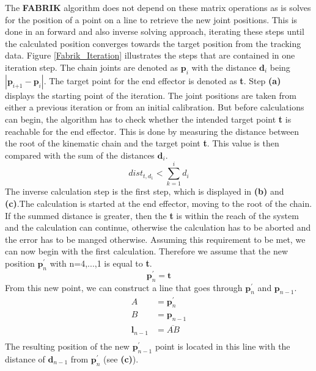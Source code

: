 The \textbf{FABRIK} algorithm does not depend on these matrix operations as is solves for the position of a point on a line to retrieve the new joint positions. This is done in an forward and also inverse solving approach, iterating these steps until the calculated position converges towards the target position from the tracking data.
Figure \ref{Fabrik_Iteration} illustrates the steps that are contained in one iteration step.
The chain joints are denoted as $\textbf{p}_{\textit{i}}$ with the distance $\textbf{d}_{i}$ being $|\textbf{p}_{\textit{i+1}}-\textbf{p}_{\textit{i}}|$. The target point for the end effector is denoted as \textbf{t}. Step \textbf{(a)} displays the starting point of the iteration. The joint positions are taken from either a previous iteration or from an initial calibration. 
But before calculations can begin, the algorithm has to check whether the intended target point \textbf{t} is reachable for the end effector. This is done by measuring the distance between the root of the kinematic chain and the target point \textbf{t}. This value is then compared with the sum of the distances $\textbf{d}_{i}$.
\begin{equation}
 dist_{t,d_{1}}< \sum_{k=1}^{i}{d_{i}}
\end{equation}The inverse calculation step is the first step, which is displayed in \textbf{(b)} and \textbf{(c)}.The calculation is started at the end effector, moving to the root of the chain. 
If the summed distance is greater, then the \textbf{t} is within the reach of the system and the calculation can continue, otherwise the calculation has to be aborted and the error has to be manged otherwise.
Assuming this requirement to be met, we can now begin with the first calculation. Therefore we assume that the new position $\textbf{p}_{n}^{'}$ with n=4,...,1 is equal to \textbf{t}.
\begin{equation}
 \textbf{p}_{n}^{'}=\textbf{t}
\end{equation}
From this new point, we can construct a line that goes through $\textbf{p}_{n}^{'}$ and $\textbf{p}_{n-1}$.
\begin{equation}
\begin{split}
A&=\textbf{p}_{n}^{'}\\
B&=\textbf{p}_{n-1}\\
\textbf{l}_{n-1}&=\overline{AB}\\
\end{split}
\end{equation}
The resulting position of the new $\textbf{p}_{n-1}^{'}$ point is located in this line with the distance of $\textbf{d}_{n-1}$ from $\textbf{p}_{n}^{'}$ (see \textbf{(c)}).
